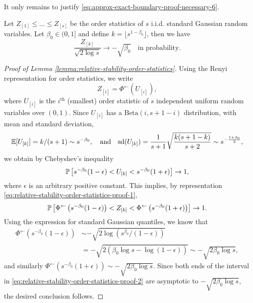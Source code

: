 It only remains to justify \eqref{eq:approx-exact-boundary-proof-necessary-6}.

\begin{lemma}
\label{lemma:relative-stability-order-statistics}
Let $Z_{[1]} \le \ldots \le Z_{[s]}$ be the order statistics of $s$ i.i.d. standard Gaussian random variables.
Let $\beta_0\in(0,1]$ and define $k=\lfloor s^{1-\beta_0}\rfloor$, then we have
\begin{equation}
    \frac{Z_{[k]}}{\sqrt{2\log{s}}} \to -\sqrt{\beta_0} \quad\text{in probability}.
\end{equation}
\end{lemma}

\begin{proof}[Proof of Lemma \ref{lemma:relative-stability-order-statistics}]
Using the Renyi representation for order statistics, we write
\begin{equation} \label{eq:relative-stability-order-statistics-proof-1}
    Z_{[i]} = \Phi^{\leftarrow}(U_{[i]}),
\end{equation}
where $U_{[i]}$ is the $i^\mathrm{th}$ (smallest) order statistic of $s$ independent uniform random variables over $(0,1)$.
Since $U_{[i]}$ has a $\mathrm{Beta}(i, s+1-i)$ distribution, with mean and standard deviation,
$$
\E[U_{[k]}] = k/(s+1) \sim s^{-\beta_0}, 
\quad \text{and} \quad
{\mathrm{sd}(U_{[k]})} = \frac{1}{s+1}\sqrt{\frac{k(s+1-k)}{s+2}} \sim s^{-\frac{1+\beta_0}{2}},
$$
we obtain by Chebyshev's inequality 
$$
\P\left[s^{-\beta_0}(1-\epsilon) < U_{[k]} < s^{-\beta_0}(1+\epsilon)\right] \to 1,
$$
where $\epsilon$ is an arbitrary positive constant.
This implies, by representation \eqref{eq:relative-stability-order-statistics-proof-1},
\begin{equation} \label{eq:relative-stability-order-statistics-proof-2}
    \P\left[\Phi^{\leftarrow}\left(s^{-\beta_0}(1-\epsilon)\right) < Z_{[k]} < \Phi^{\leftarrow}\left(s^{-\beta_0}(1+\epsilon)\right)\right] \to 1.
\end{equation}
Using the expression for standard Gaussian quantiles, we know that
\begin{align*}
    \Phi^{\leftarrow}\left(s^{-\beta_0}(1-\epsilon)\right) 
    &\sim -\sqrt{2\log{\left(s^{\beta_0}/(1-\epsilon)\right)}} \\
    &= -\sqrt{2(\beta_0\log{s} - \log{(1-\epsilon)})} \sim -\sqrt{2\beta_0\log{s}},
\end{align*}
and similarly $\Phi^{\leftarrow}\left(s^{-\beta_0}(1+\epsilon)\right)\sim -\sqrt{2\beta_0\log{s}}$.
Since both ends of the interval in \eqref{eq:relative-stability-order-statistics-proof-2} are asymptotic to $-\sqrt{2\beta_0\log{s}}$, 
the desired conclusion follows.
\end{proof}

